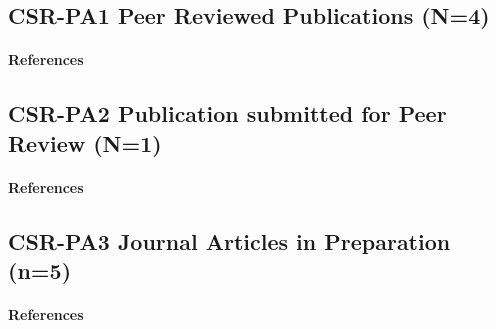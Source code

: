 \subsection{CSR-PA1 Peer Reviewed Publications (N=4)}
\paragraph{References}
	\begin{refsection}
		\nocite{siderhurst_effects_2021, barrera_electron_2021, marshall_production_2021, cave_biological_2022}
		\printbibliography[heading=none]	
	\end{refsection}

\subsection{CSR-PA2 Publication submitted for Peer Review (N=1)}
\paragraph{References}
\begin{refsection}
	\nocite{moore_detecting_2022}
	\printbibliography[heading=none]	
\end{refsection}

\newpage
\subsection{CSR-PA3 Journal Articles in Preparation (n=5)}
\paragraph{References}
\begin{refsection}
	\nocite{moore_first_nodate-1,moore_mariana_2013,moore_three_nodate-1,moore_change_nodate,moore_coconut_nodate-1}	
	\printbibliography[heading=none]		
\end{refsection}

